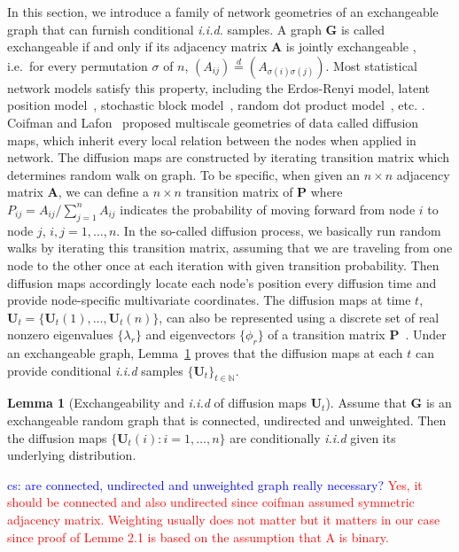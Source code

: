 \documentclass[11pt]{article}
\theoremstyle{definition}
\newtheorem{lemma}[theorem]{Lemma}
\newcommand{\cs}[1]{\textcolor{blue}{cs: #1}}
\begin{document}
In this section, we introduce a family of network geometries of an exchangeable graph \cite{coifman2006diffusion} that can furnish conditional \textit{i.i.d.} samples.
A graph $\mathbf{G}$ is called exchangeable if and only if its adjacency matrix $\mathbf{A}$ is jointly exchangeable \citep{orbanz2015bayesian}, i.e.~for every permutation $\sigma$ of $n$, $(A_{ij}) \stackrel{d}{=} (A_{\sigma(i) \sigma(j)})$. Most statistical network models satisfy this property, including the Erdos-Renyi model, latent position model~\cite{fosdick2015testing}, stochastic block model~\citep{rohe2011spectral}, random dot product model~\citep{sussman2014consistent}, etc. \citep{HollandEtAl1983, YoungScheinerman2007,karrer2011stochastic,ZhaoLevinaZhu2012}. Coifman and Lafon~\citep{coifman2006diffusion} proposed multiscale geometries of data called diffusion maps, which inherit every local relation between the nodes when applied in network. The diffusion maps are constructed by iterating transition matrix which determines random walk on graph. To be specific, when given an $n \times n$ adjacency matrix $\mathbf{A}$, we can define a $n \times n$ transition matrix of $\mathbf{P}$ where $P_{ij} = A_{ij} /  \sum\limits_{j=1}^{n} A_{ij}$ indicates the probability of moving forward from node $i$ to node $j$, $i,j = 1, \ldots , n$. In the so-called diffusion process, we basically run random walks by iterating this transition matrix, assuming that we are traveling from one node to the other  once at each iteration with given transition probability. Then diffusion maps accordingly locate each node's position every diffusion time and provide node-specific multivariate coordinates. The diffusion maps at time $t$, ~$\mathbf{U}_{t} = \{ \mathbf{U}_{t}(1) , \ldots, \mathbf{U}_{t}(n) \}$, can also be represented using a discrete set of real nonzero eigenvalues $\{ \lambda_{r} \}$ and eigenvectors $\{ \phi_{r}  \}$ of a transition matrix $\mathbf{P}$~\citep{coifman2006diffusion,lafon2006diffusion}. Under an exchangeable graph, Lemma~\ref{main_lemma} proves that the diffusion maps at each $t$ can provide conditional \textit{i.i.d} samples $\{ \mathbf{U}_{t} \}_{t \in \mathbb{N}}$. 
\begin{lemma}[Exchangeability and \textit{i.i.d} of diffusion maps $\mathbf{U}_{t}$]
	\label{main_lemma}
	Assume that $\mathbf{G}$ is an exchangeable random graph that is connected, undirected and unweighted. Then the diffusion maps $\{ \mathbf{U}_{t}(i) : i = 1, \ldots, n \}$ are conditionally \textit{i.i.d} given its underlying distribution.   
\end{lemma}
\cs{are connected, undirected and unweighted graph really necessary?} \textcolor{red}{Yes, it should be connected and also undirected since coifman assumed symmetric adjacency matrix. Weighting usually does not matter but it matters in our case since proof of Lemme 2.1 is based on the assumption that A is binary.}
\end{document}
